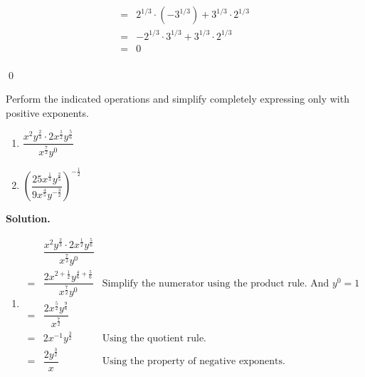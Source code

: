 \begin{ex}
\begin{enumerate}
\[\begin{array}{rclr}
& = & 2^{1/3} \cdot (-3^{1/3}) +3^{1/3} \cdot 2^{1/3}  & \\ [3pt]

& = &  - 2^{1/3} \cdot 3^{1/3} +3^{1/3} \cdot 2^{1/3}  & \\ [3pt]

& = & 0 & \\ \end{array} \] 

\vspace{-.3in} \qed

\end{enumerate}

\end{ex}

\medskip

\begin{ex} \label{exponentreview3}  Perform the indicated operations and simplify completely expressing only with positive
exponents.

\begin{multicols}{2}
\begin{enumerate}

\item $\dfrac{x^2 y^{\frac{2}{3}} \cdot 2 x^{\frac{1}{2}}y^{\frac{5}{6}}}{x^{\frac{7}{2}} y^0}$
\item $\left( \dfrac{25 x^{\frac{1}{3}} y^{\frac{2}{5}}}{9 x^{\frac{4}{5}} y^{-\frac{3}{2}}} \right)^{- \frac{1}{2}}$ 

\end{enumerate}
\end{multicols}

{\bf Solution.}

\begin{enumerate}

\item \[
\begin{array}{cll}
& \dfrac{x^2 y^{\frac{2}{3}} \cdot 2 x^{\frac{1}{2}}y^{\frac{5}{6}}}{x^{\frac{7}{2}} y^0} &  \\[8pt]
=& \dfrac{2x^{2+\frac{1}{2}} y^{\frac{4}{6}+\frac{5}{6}}}{x^{\frac{7}{2}} y^0} & \text{Simplify the numerator using the product rule. And $y^0=1$}\\[8pt]
=& \dfrac{2 x^{\frac{5}{2}} y^{\frac{9}{6}}}{x^{\frac{7}{2}}} & \\[8pt]
=&  2 x^{- 1} y^{\frac{3}{2}} & \text{Using the quotient rule.}\\[8pt]
=&  \dfrac{2 y^{\frac{3}{2}}}{x} & \text{Using the property of negative exponents.} 
\end{array}
\]


\end{enumerate}
\end{ex}
